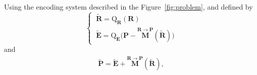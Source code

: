 Using the encoding system described in the Figure~\ref{fig:problem}, and defined by
\begin{equation}
  \left\{\
    \begin{array}{l}
      \tilde{\mathbf R} = \text{Q}_{\mathbf R}({\mathbf R}) \\
      \tilde{\mathbf E} = \text{Q}_{\mathbf E}\big({\mathbf P}-\overset{{\mathbf R}\rightarrow {\mathbf P}}{\mathbf M}(\tilde{\mathbf R})\big)
    \end{array}
  \right.
  \label{eq:forward}
\end{equation}
and
\begin{equation}
  \begin{array}{l}
    \tilde{\mathbf P} = \tilde{\mathbf E} + \overset{{\mathbf R}\rightarrow {\mathbf P}}{\mathbf M}(\tilde{\mathbf R}),
  \end{array}
  \label{eq:backward}
\end{equation}

